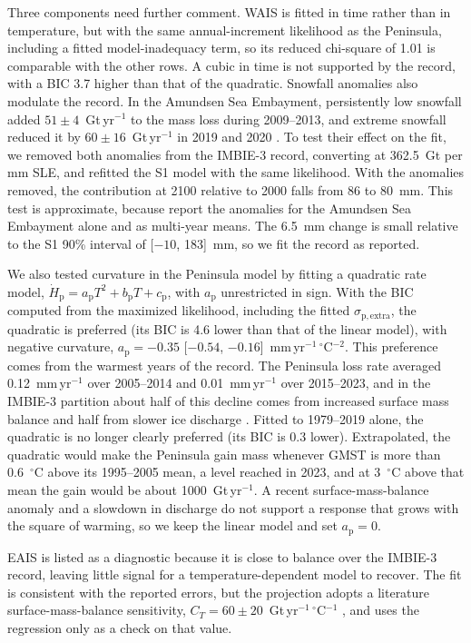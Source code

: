 \documentclass[12pt]{article}
\begin{document}
Three components need further comment. WAIS is fitted in time rather than in temperature, but with the same annual-increment likelihood as the Peninsula, including a fitted model-inadequacy term, so its reduced chi-square of 1.01 is comparable with the other rows. A cubic in time is not supported by the record, with a BIC 3.7 higher than that of the quadratic. Snowfall anomalies also modulate the record. In the Amundsen Sea Embayment, persistently low snowfall added $51 \pm 4$~Gt\,yr$^{-1}$ to the mass loss during 2009--2013, and extreme snowfall reduced it by $60 \pm 16$~Gt\,yr$^{-1}$ in 2019 and 2020 \citep{Davison2023}. To test their effect on the fit, we removed both anomalies from the IMBIE-3 record, converting at 362.5~Gt per mm SLE, and refitted the S1 model with the same likelihood. With the anomalies removed, the contribution at 2100 relative to 2000 falls from 86 to 80~mm. This test is approximate, because \citet{Davison2023} report the anomalies for the Amundsen Sea Embayment alone and as multi-year means. The 6.5~mm change is small relative to the S1 90\% interval of [$-10$, 183]~mm, so we fit the record as reported.

We also tested curvature in the Peninsula model by fitting a quadratic rate model, $\dot{H}_{\mathrm{p}} = a_{\mathrm{p}}T^2 + b_{\mathrm{p}}T + c_{\mathrm{p}}$, with $a_{\mathrm{p}}$ unrestricted in sign. With the BIC computed from the maximized likelihood, including the fitted $\sigma_{\mathrm{p,extra}}$, the quadratic is preferred (its BIC is 4.6 lower than that of the linear model), with negative curvature, $a_{\mathrm{p}} = -0.35$ [$-0.54$, $-0.16$]~mm\,yr$^{-1}$\,$^\circ$C$^{-2}$. This preference comes from the warmest years of the record. The Peninsula loss rate averaged 0.12~mm\,yr$^{-1}$ over 2005--2014 and 0.01~mm\,yr$^{-1}$ over 2015--2023, and in the IMBIE-3 partition about half of this decline comes from increased surface mass balance and half from slower ice discharge \citep{Otosaka2026}. Fitted to 1979--2019 alone, the quadratic is no longer clearly preferred (its BIC is 0.3 lower). Extrapolated, the quadratic would make the Peninsula gain mass whenever GMST is more than 0.6~$^\circ$C above its 1995--2005 mean, a level reached in 2023, and at 3~$^\circ$C above that mean the gain would be about 1000~Gt\,yr$^{-1}$. A recent surface-mass-balance anomaly and a slowdown in discharge do not support a response that grows with the square of warming, so we keep the linear model and set $a_{\mathrm{p}} = 0$.

EAIS is listed as a diagnostic because it is close to balance over the IMBIE-3 record, leaving little signal for a temperature-dependent model to recover. The fit is consistent with the reported errors, but the projection adopts a literature surface-mass-balance sensitivity, $C_T = 60 \pm 20$~Gt\,yr$^{-1}$\,$^\circ$C$^{-1}$ \citep{Frieler2015,Ligtenberg2013}, and uses the regression only as a check on that value.
\end{document}
